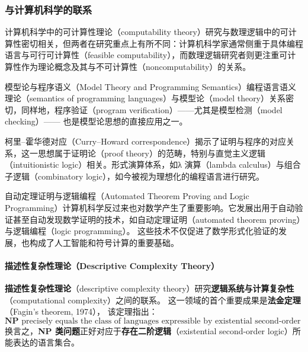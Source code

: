 \subsubsection{与计算机科学的联系}
计算机科学中的可计算性理论（computability theory）研究与数理逻辑中的可计算性密切相关，但两者在研究重点上有所不同：计算机科学家通常侧重于具体编程语言与可行可计算性（feasible computability），而数理逻辑研究者则更注重可计算性作为理论概念及其与不可计算性（noncomputability）的关系。

模型论与程序语义（Model Theory and Programming Semantics）编程语言语义理论（semantics of programming languages）与模型论（model theory）关系密切，同样地，程序验证（program verification）——尤其是模型检测（model checking）—— 也是模型论思想的直接应用之一。  

柯里–霍华德对应（Curry–Howard correspondence）揭示了证明与程序的对应关系，这一思想属于证明论（proof theory）的范畴，特别与直觉主义逻辑（intuitionistic logic）相关。形式演算体系，如λ 演算（lambda calculus）与组合子逻辑（combinatory logic），如今被视为理想化的编程语言进行研究。

自动定理证明与逻辑编程（Automated Theorem Proving and Logic Programming）计算机科学反过来也对数学产生了重要影响。它发展出用于自动验证甚至自动发现数学证明的技术，如自动定理证明（automated theorem proving）与逻辑编程（logic programming）。  
这些技术不仅促进了数学形式化验证的发展，也构成了人工智能和符号计算的重要基础。

\paragraph{描述性复杂性理论（Descriptive Complexity Theory）}
\textbf{描述性复杂性理论}（descriptive complexity theory）研究\textbf{逻辑系统与计算复杂性}（computational complexity）之间的联系。  
这一领域的首个重要成果是\textbf{法金定理}（Fagin’s theorem, 1974），  
该定理指出：
\[
\mathbf{NP} \text{ precisely equals the class of languages expressible by existential second-order logic.}
\]
换言之，\textbf{NP 类问题}正好对应于\textbf{存在二阶逻辑}（existential second-order logic）所能表达的语言集合。

